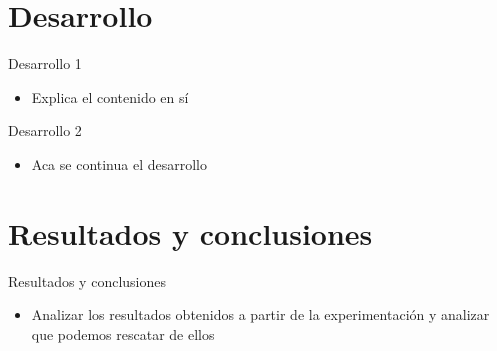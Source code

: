 \documentclass{beamer}
\begin{document}
\section{Desarrollo}
    \begin{frame}{Desarrollo 1}
        \begin{itemize}
            \item Explica el contenido en sí
        \end{itemize}
    \end{frame}
    
    \begin{frame}{Desarrollo 2}
        \begin{itemize}
            \item Aca se continua el desarrollo
        \end{itemize}
    \end{frame}
    
\section{Resultados y conclusiones}
    \begin{frame}{Resultados y conclusiones}
        \begin{itemize}
            \item Analizar los resultados obtenidos a partir de la experimentación y analizar que podemos rescatar de ellos
        \end{itemize}
    \end{frame}
    
\end{document}
